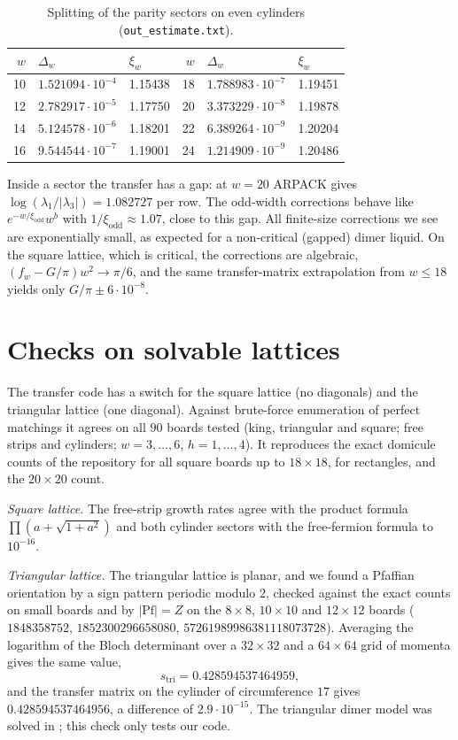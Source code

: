 \documentclass[11pt]{amsart}
\theoremstyle{definition}
\theoremstyle{remark}
\newcommand{\file}[1]{\texttt{#1}}
\begin{document}
\begin{table}[ht]
\caption{Splitting of the parity sectors on even cylinders (\file{out\_estimate.txt}).}\label{tab:z2}
\begin{tabular}{rll@{\qquad}rll}
\toprule
$w$ & $\Delta_w$ & $\xi_w$ & $w$ & $\Delta_w$ & $\xi_w$ \\
\midrule
10 & $1.521094\cdot10^{-4}$ & 1.15438 & 18 & $1.788983\cdot10^{-7}$ & 1.19451 \\
12 & $2.782917\cdot10^{-5}$ & 1.17750 & 20 & $3.373229\cdot10^{-8}$ & 1.19878 \\
14 & $5.124578\cdot10^{-6}$ & 1.18201 & 22 & $6.389264\cdot10^{-9}$ & 1.20204 \\
16 & $9.544544\cdot10^{-7}$ & 1.19001 & 24 & $1.214909\cdot10^{-9}$ & 1.20486 \\
\bottomrule
\end{tabular}
\end{table}

Inside a sector the transfer has a gap: at $w = 20$ ARPACK gives $\log(\lambda_1/|\lambda_3|) =
1.082727$ per row. The odd-width corrections behave like $e^{-w/\xi_{\mathrm{odd}}} w^b$ with
$1/\xi_{\mathrm{odd}} \approx 1.07$, close to this gap. All finite-size corrections we see are
exponentially small, as expected for a non-critical (gapped) dimer liquid. On the
square lattice, which is critical, the corrections are algebraic, $(f_w - G/\pi)w^2 \to \pi/6$, and the
same transfer-matrix extrapolation from $w \le 18$ yields only $G/\pi \pm 6\cdot10^{-8}$.

\section{Checks on solvable lattices}\label{sec:checks}
The transfer code has a switch for the square lattice (no diagonals) and the triangular lattice
(one diagonal). Against brute-force enumeration of perfect matchings it agrees on all $90$ boards
tested (king, triangular and square; free strips and cylinders; $w = 3, \dots, 6$, $h = 1, \dots, 4$).
It reproduces the exact domicule counts of the repository for all square boards up to
$18\times18$, for rectangles, and the $20\times20$ count.

\emph{Square lattice.} The free-strip growth rates agree with the product formula
$\prod(a + \sqrt{1 + a^2})$ and both cylinder sectors with the free-fermion formula to $10^{-16}$.

\emph{Triangular lattice.} The triangular lattice is planar, and we found a Pfaffian orientation
by a sign pattern periodic modulo $2$, checked against the exact counts on small boards and by
$|\mathrm{Pf}| = Z$ on the $8\times8$, $10\times10$ and $12\times12$ boards ($1848358752$,
$1852300296658080$, $57261989986381118073728$). Averaging the logarithm of the Bloch determinant
over a $32\times32$ and a $64\times64$ grid of momenta gives the same value,
\[
  s_{\mathrm{tri}} = 0.428594537464959,
\]
and the transfer matrix on the cylinder of circumference $17$ gives $0.428594537464956$, a
difference of $2.9\cdot10^{-15}$. The triangular dimer model was solved in \cite{fms2002}; this
check only tests our code.
\end{document}
